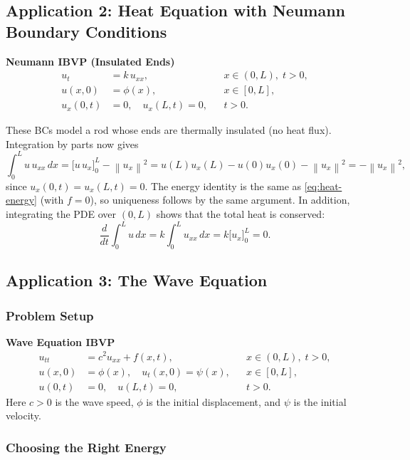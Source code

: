 \documentclass[12pt,a4paper]{article}
\theoremstyle{plain}
\theoremstyle{definition}
\newcommand{\norm}[1]{\left\lVert #1 \right\rVert}
\newcommand{\ddt}{\dfrac{d}{dt}}
\begin{document}
\subsection{Application 2: Heat Equation with Neumann Boundary Conditions}

\begin{mdframed}[style=keybox]
\textbf{Neumann IBVP (Insulated Ends)}
\begin{align}
  u_t &= k\,u_{xx}, && x\in(0,L),\; t>0,\\
  u(x,0) &= \phi(x), && x\in[0,L],\\
  u_x(0,t) &= 0,\quad u_x(L,t)=0, && t>0.
\end{align}
\end{mdframed}
These BCs model a rod whose ends are thermally insulated (no heat flux).
Integration by parts now gives
\[
  \int_0^L u\,u_{xx}\,dx = \bigl[u\,u_x\bigr]_0^L - \norm{u_x}^2
  = u(L)u_x(L) - u(0)u_x(0) - \norm{u_x}^2 = -\norm{u_x}^2,
\]
since $u_x(0,t)=u_x(L,t)=0$. The energy identity is the same as
\eqref{eq:heat-energy} (with $f=0$), so uniqueness follows by the same argument.
In addition, integrating the PDE over $(0,L)$ shows that the total heat is
conserved:
\[
  \ddt\int_0^L u\,dx = k\int_0^L u_{xx}\,dx = k\bigl[u_x\bigr]_0^L = 0.
\]

\subsection{Application 3: The Wave Equation}

\subsubsection*{Problem Setup}

\begin{mdframed}[style=keybox]
\textbf{Wave Equation IBVP}
\begin{align}
  u_{tt} &= c^2 u_{xx} + f(x,t), && x\in(0,L),\; t>0, \label{eq:wave-pde}\\
  u(x,0) &= \phi(x),\quad u_t(x,0)=\psi(x), && x\in[0,L], \label{eq:wave-ic}\\
  u(0,t) &= 0,\quad u(L,t)=0, && t>0. \label{eq:wave-bc}
\end{align}
Here $c>0$ is the wave speed, $\phi$ is the initial displacement, and $\psi$
is the initial velocity.
\end{mdframed}

\subsubsection*{Choosing the Right Energy}
\end{document}
